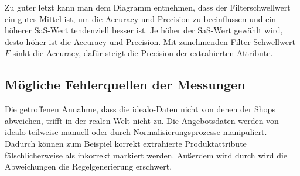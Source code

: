 Zu guter letzt kann man dem Diagramm entnehmen, dass der Filterschwellwert ein gutes Mittel ist, um die Accuracy und
Precision zu beeinflussen und ein höherer SaS-Wert tendenziell besser ist.
Je höher der SaS-Wert gewählt wird, desto höher ist die Accuracy und Precision.
Mit zunehmenden Filter-Schwellwert $F$ sinkt die Accuracy, dafür steigt die Precision der extrahierten Attribute.

\subsection{Mögliche Fehlerquellen der Messungen}
\label{subsec:fehlerquellen}

Die getroffenen Annahme, dass die idealo-Daten nicht von denen der Shops abweichen, trifft in der realen Welt nicht zu.
Die Angebotsdaten werden von idealo teilweise manuell oder durch Normalisierungsprozesse manipuliert.
Dadurch können zum Beispiel korrekt extrahierte Produktattribute fälschlicherweise als inkorrekt markiert werden.
Außerdem wird durch wird die Abweichungen die Regelgenerierung erschwert.